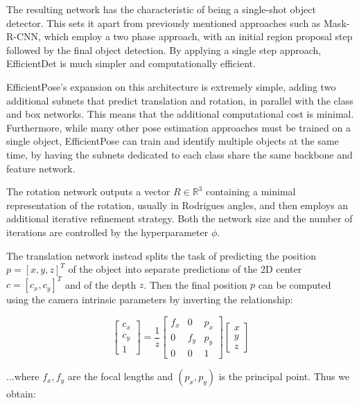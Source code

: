 The resulting network has the characteristic of being a single-shot object detector. This sets it apart from previously mentioned approaches such as Mask-R-CNN, which employ a two phase approach, with an initial region proposal step followed by the final object detection. By applying a single step approach, EfficientDet is much simpler and computationally efficient.



EfficientPose's expansion on this architecture is extremely simple, adding two additional subnets that predict translation and rotation, in parallel with the class and box networks. This means that the additional computational cost is minimal. Furthermore, while many other pose estimation approaches must be trained on a single object, EfficientPose can train and identify multiple objects at the same time, by having the subnets dedicated to each class share the same backbone and feature network.

The rotation network outputs a vector $R \in \mathbb{R}^3$ containing a minimal representation of the rotation, usually in Rodrigues angles, and then employs an additional iterative refinement strategy. Both the network size and the number of iterations are controlled by the hyperparameter $\phi$.

The translation network instead splits the task of predicting the position $p=[x, y, z]^T$ of the object into separate predictions of the 2D center $c = [c_x, c_y]^T$ and of the depth $z$. Then the final position $p$ can be computed using the camera intrinsic parameters by inverting the relationship:

\begin{equation}
    \begin{bmatrix}
        c_x\\c_y\\1
    \end{bmatrix}
    = \frac{1}{z}
    \begin{bmatrix}
        f_x & 0 & p_x \\
        0 & f_y & p_y \\
        0 & 0 & 1 
    \end{bmatrix}
    \begin{bmatrix}
        x\\y\\z
    \end{bmatrix}
\end{equation}

...where $f_x, f_y$ are the focal lengths and $(p_x, p_y)$ is the principal point. Thus we obtain:

